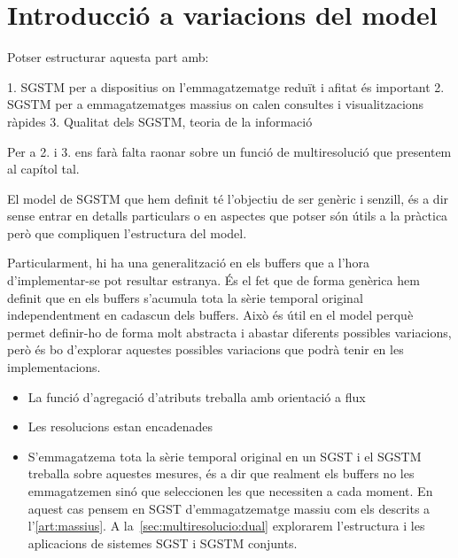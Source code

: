 \chapter{Introducció a variacions del model}





Potser estructurar aquesta part amb:

1. SGSTM per a dispositius on l'emmagatzematge reduït i afitat és important
2. SGSTM per a emmagatzematges massius on calen consultes i visualitzacions ràpides
3. Qualitat dels SGSTM, teoria de la informació



Per a 2. i 3. ens farà falta raonar sobre un funció de multiresolució que presentem al capítol tal.









El model de \gls{SGSTM} que hem definit té l'objectiu de ser genèric i senzill, és a dir sense entrar en detalls particulars o en aspectes que potser són útils a la pràctica però que compliquen l'estructura del model.


Particularment, hi ha una generalització en els buffers que a l'hora d'implementar-se pot resultar estranya. És el fet que de forma genèrica hem definit que en els buffers s'acumula tota la sèrie temporal original independentment en cadascun dels buffers. Això és útil en el model perquè permet definir-ho de forma molt abstracta i abastar diferents possibles variacions, però és bo d'explorar aquestes possibles variacions que podrà tenir en les implementacions.

\begin{itemize}
\item La funció d'agregació d'atributs treballa amb orientació a flux

\item Les resolucions estan encadenades

\item S'emmagatzema tota la sèrie temporal original en un \gls{SGST} i el
\gls{SGSTM} treballa sobre aquestes mesures, és a dir que realment els
buffers no les emmagatzemen sinó que seleccionen les que necessiten a
cada moment. En aquest cas pensem en \gls{SGST} d'emmagatzematge
massiu com els descrits a l'\autoref{art:massius}. A
la~\autoref{sec:multiresolucio:dual} explorarem l'estructura i les
aplicacions de sistemes \gls{SGST} i \gls{SGSTM} conjunts.

\end{itemize}

